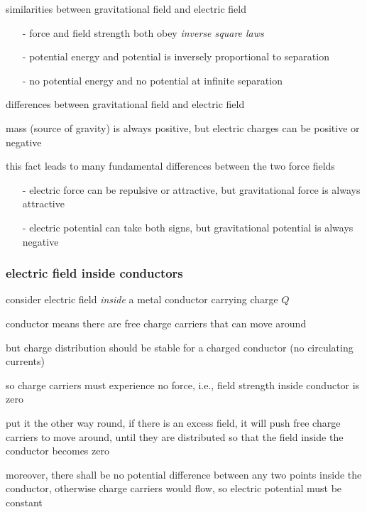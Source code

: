\cmt similarities between gravitational field and electric field

\begin{itemize}
	\item[-] force and field strength both obey \emph{inverse square laws}
	
	\item[-] potential energy and potential is inversely proportional to separation
	
	\item[-] no potential energy and no potential at infinite separation
\end{itemize}

\cmt differences between gravitational field and electric field

mass (source of gravity) is always positive, but electric charges can be positive or negative

this fact leads to many fundamental differences between the two force fields

\begin{itemize}
\item[-] electric force can be repulsive or attractive, but gravitational force is always attractive

\item[-] electric potential can take both signs, but gravitational potential is always negative
\end{itemize}

\subsubsection{electric field inside conductors}\label{inside-conductors}

consider electric field \emph{inside} a metal conductor carrying charge $Q$

conductor means there are free charge carriers that can move around 

but charge distribution should be stable for a charged conductor (no circulating currents)

so charge carriers must experience no force, i.e., field strength inside conductor is zero

put it the other way round, if there is an excess field, it will push free charge carriers to move around, until they are distributed so that the field inside the conductor becomes zero

moreover, there shall be no potential difference between any two points inside the conductor, otherwise charge carriers would flow, so electric potential must be constant

